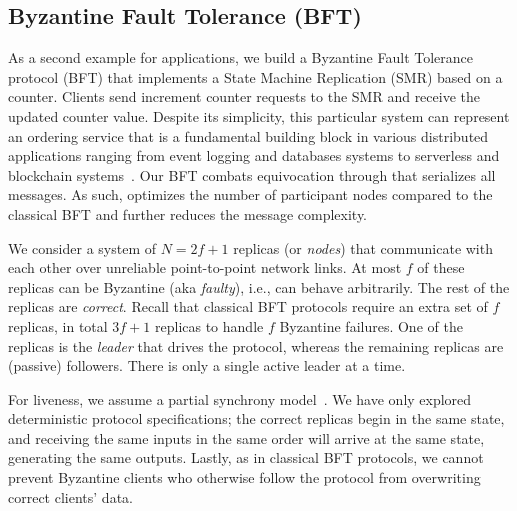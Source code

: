 \subsection{Byzantine Fault Tolerance (BFT)}\label{sec:use_cases::byz_smr}

As a second example for \projecttitle{} applications, we build a Byzantine Fault Tolerance protocol (BFT) that implements a State Machine Replication (SMR) based on a counter. Clients send increment counter requests to the SMR and receive the updated counter value. Despite its simplicity, this particular system can represent an ordering service that is a fundamental building block in various distributed applications ranging from event logging and databases systems to serverless and blockchain systems~\cite{rafthyperledger, Kafka, boki, 10.1145/3286685.3286686, scalog}. Our BFT combats equivocation through \projecttitle{} that serializes all messages. As such, \projecttitle{} optimizes the number of participant nodes compared to the classical BFT and further reduces the message complexity.

 We consider a system of $N=2f+1$ replicas (or {\em nodes}) that communicate with each other over unreliable point-to-point network links. At most $f$ of these replicas can be Byzantine (aka {\em faulty}), i.e., can behave arbitrarily. The rest of the replicas are {\em correct}. Recall that classical BFT protocols require an extra set of $f$ replicas, in total $3f+1$ replicas to handle $f$ Byzantine failures. One of the replicas is the {\em leader} that drives the protocol, whereas the remaining replicas are (passive) followers. There is only a single active leader at a time.

For liveness, we assume a partial synchrony model~\cite{FLP, 10.1145/226643.226647}. We have only explored deterministic protocol specifications; the correct replicas begin in the same state, and receiving the same inputs in the same order will arrive at the same state, generating the same outputs. Lastly, as in classical BFT protocols, we cannot prevent Byzantine clients who otherwise follow the protocol from overwriting correct clients’ data.


